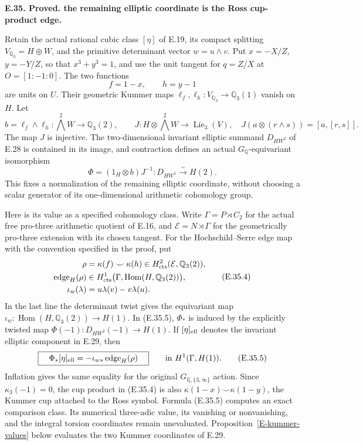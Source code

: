\documentclass[11pt,oneside]{article}
\makeatletter
\newcounter{statementanchor}
\newenvironment{statement}[3]{%
 \refstepcounter{statementanchor}\def\@currentlabel{#1}%
 \par\addvspace{9pt}\noindent
 \textbf{#1. #2. #3.}\par\nobreak\noindent\ignorespaces
}{\par\addvspace{5pt}}
\makeatother
\begin{document}
\begin{statement}{E.35}{Proved}{the remaining elliptic coordinate is the Ross cup-product edge}
\label{st:E.35}
\label{E-ross-edge}
Retain the actual rational cubic class $[\eta]$ of
E.19, its compact splitting $V_{\mathbb Q_3}=H\oplus W$,
and the primitive determinant vector $w=u\wedge v$.
Put $x=-X/Z$, $y=-Y/Z$, so that $x^3+y^3=1$, and
use the unit tangent for $q=Z/X$ at $O=[1:-1:0]$.
The two functions
\[
 f=1-x,\qquad h=y-1
 \tag{E.35.1}
\]
are units on $U$. Their geometric Kummer maps
$\ell_f,\ell_h:V_{\mathbb Q_3}\to\mathbb Q_3(1)$
vanish on $H$. Let
\[
 b=\ell_f\wedge\ell_h:
       \bigwedge^2W\longrightarrow\mathbb Q_3(2),
 \qquad
 J:H\otimes\bigwedge^2W\longrightarrow\operatorname{Lie}_3(V),
 \quad J(a\otimes(r\wedge s))=[a,[r,s]].
 \tag{E.35.2}
\]
The map $J$ is injective. The two-dimensional invariant
elliptic summand $D_{HW^2}$ of E.28 is contained in its
image, and contraction defines an actual
$G_{\mathbb Q}$-equivariant isomorphism
\[
 \Phi=(1_H\otimes b)J^{-1}:
       D_{HW^2}\xrightarrow{\sim}H(2).
 \tag{E.35.3}
\]
This fixes a normalization of the remaining elliptic
coordinate, without choosing a scalar generator of its
one-dimensional arithmetic cohomology group.

Here is its value as a specified cohomology class.
Write $\Gamma=P\rtimes C_2$ for the actual free
pro-three arithmetic quotient of E.16, and
$\mathcal E=N\rtimes\Gamma$ for the geometrically
pro-three extension with its chosen tangent.
For the Hochschild--Serre edge map with the convention
specified in the proof, put
\[
 \begin{aligned}
 \rho&=\kappa(f)\smile\kappa(h)
              \in H^2_{\rm cts}(\mathcal E,\mathbb Q_3(2)),\\
 \operatorname{edge}_H(\rho)&\in
 H^1_{\rm cts}\bigl(\Gamma,
                   \operatorname{Hom}(H,\mathbb Q_3(2))\bigr),\\
 \iota_w(\lambda)&=u\lambda(v)-v\lambda(u).
 \end{aligned}
 \tag{E.35.4}
\]
In the last line the determinant twist gives the
equivariant map
$\iota_w:\operatorname{Hom}(H,\mathbb Q_3(2))\to H(1)$.
In (E.35.5), $\Phi_*$ is induced by the explicitly
twisted map $\Phi(-1):D_{HW^2}(-1)\to H(1)$.
If $[\eta]_{\rm ell}$ denotes the invariant elliptic
component in E.29, then
\[
 \boxed{\quad
  \Phi_*[\eta]_{\rm ell}
      =-\iota_{w*}\operatorname{edge}_H(\rho)
       \quad}\qquad\text{in }H^1(\Gamma,H(1)).
 \tag{E.35.5}
\]
Inflation gives the same equality for the original
$G_{\mathbb Q,\{3,\infty\}}$ action. Since
$\kappa_3(-1)=0$, the cup product in (E.35.4) is
also $\kappa(1-x)\smile\kappa(1-y)$, the Kummer
cup attached to the Ross symbol.
Formula (E.35.5) computes an exact comparison class.
Its numerical three-adic value, its vanishing or
nonvanishing, and the integral torsion coordinates
remain unevaluated. Proposition~\ref{E-kummer-values}
below evaluates the two Kummer coordinates of E.29.
\end{statement}
\end{document}
